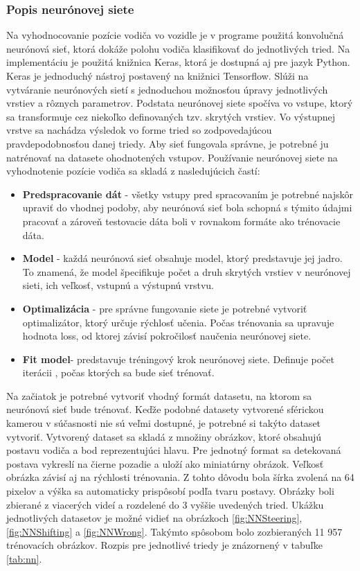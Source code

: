 \documentclass[slovak,master,dept460,male,cpp,cpdeclaration]{diploma}
\begin{document}
\subsubsection*{Popis neurónovej siete}
Na vyhodnocovanie pozície  vodiča vo vozidle je v programe použitá konvolučná neurónová sieť, ktorá dokáže polohu vodiča klasifikovať do jednotlivých tried. Na implementáciu je použitá knižnica Keras, ktorá je dostupná aj pre jazyk Python. Keras je jednoduchý nástroj postavený na knižnici Tensorflow. Slúži na vytváranie neurónových sietí s jednoduchou možnosťou úpravy jednotlivých vrstiev a rôznych parametrov. Podstata neurónovej siete spočíva  vo vstupe, ktorý sa transformuje cez niekoľko definovaných tzv. skrytých vrstiev. Vo výstupnej vrstve sa nachádza výsledok vo forme tried so zodpovedajúcou pravdepodobnosťou danej triedy. Aby  sieť fungovala správne, je potrebné ju natrénovať na  datasete ohodnotených vstupov. Používanie neurónovej siete na vyhodnotenie pozície vodiča sa  skladá z nasledujúcich častí:
\begin{itemize}
\item \textbf{Predspracovanie dát} - všetky vstupy pred spracovaním je potrebné najskôr upraviť do vhodnej podoby, aby neurónová sieť bola schopná s týmito údajmi pracovať a zároveň testovacie dáta boli v rovnakom formáte ako trénovacie dáta. 

\item \textbf{Model} - každá neurónová sieť obsahuje model, ktorý predstavuje jej jadro. To znamená, že model špecifikuje počet a druh skrytých vrstiev v neurónovej sieti, ich veľkosť, vstupnú a výstupnú vrstvu.
\item \textbf{Optimalizácia} - pre správne fungovanie siete je potrebné vytvoriť optimalizátor, ktorý určuje rýchlosť učenia. Počas trénovania sa upravuje hodnota loss, od ktorej závisí pokročilosť naučenia neurónovej siete.
\item \textbf{Fit model}- predstavuje tréningový krok neurónovej siete. Definuje počet iterácii , počas ktorých sa bude sieť trénovať.
\end{itemize}

Na začiatok je potrebné vytvoriť vhodný formát datasetu, na ktorom sa neurónová sieť  bude trénovať. Keďže  podobné datasety vytvorené sférickou kamerou v súčasnosti nie sú veľmi dostupné, je potrebné si takýto dataset vytvoriť. Vytvorený dataset  sa skladá z množiny obrázkov, ktoré obsahujú postavu vodiča a bod reprezentujúci hlavu. Pre jednotný format sa detekovaná postava vykreslí na čierne pozadie a uloží ako miniatúrny obrázok. Veľkosť obrázka závisí aj na rýchlosti trénovania. Z tohto dôvodu bola šírka zvolená na 64 pixelov a výška  sa automaticky prispôsobí podľa tvaru postavy. Obrázky boli zbierané z viacerých videí  a rozdelené do 3 vyššie uvedených tried. Ukážku jednotlivých datasetov je možné vidieť  na obrázkoch \ref{fig:NNSteering}, \ref{fig:NNShifting}  a \ref{fig:NNWrong}. Takýmto spôsobom bolo zozbieraných 11 957 trénovacích obrázkov. Rozpis pre jednotlivé triedy je  znázornený v tabuľke \ref{tab:nn}.
\end{document}
